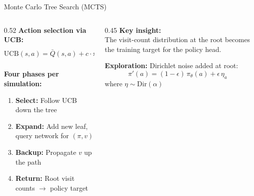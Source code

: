 \documentclass[aspectratio=169, 10pt]{beamer}
\begin{document}
\begin{frame}{Monte Carlo Tree Search (MCTS)}
\begin{columns}[T]
\begin{column}{0.52\textwidth}
\textbf{Action selection via UCB:}
\[
  \text{UCB}(s,a) = \bar{Q}(s,a) + c \cdot \pi_\theta(a|s) \cdot \frac{\sqrt{N(s)}}{1 + N(s,a)}
\]

\vspace{0.2cm}
\textbf{Four phases per simulation:}
\begin{enumerate}
  \item \textbf{Select:} Follow UCB down the tree
  \item \textbf{Expand:} Add new leaf, query network for $(\pi, v)$
  \item \textbf{Backup:} Propagate $v$ up the path
  \item \textbf{Return:} Root visit counts $\to$ policy target
\end{enumerate}
\end{column}
\begin{column}{0.45\textwidth}
\vspace{0.3cm}
\textbf{Key insight:}\\[0.3cm]
The visit-count distribution at the root becomes the \alert{training target} for the policy head.

\vspace{0.5cm}
\textbf{Exploration:} Dirichlet noise added at root:
\[
  \pi'(a) = (1-\epsilon)\,\pi_\theta(a) + \epsilon\,\eta_a
\]
where $\eta \sim \text{Dir}(\alpha)$
\end{column}
\end{columns}
\end{frame}
\end{document}
